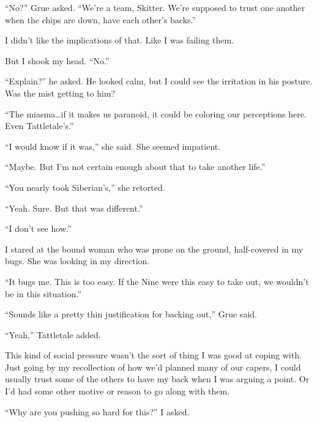 ``No?''  Grue asked.  ``We're a team, Skitter.  We're supposed to trust one another when the chips are down, have each other's backs.''



I didn't like the implications of that.  Like I was failing them.



But I shook my head.  ``No.''



``Explain?'' he asked.  He looked calm, but I could see the irritation in his posture.  Was the mist getting to him?



``The miasma\ldots if it makes us paranoid, it could be coloring our perceptions here.  Even Tattletale's.''



``I would know if it was,'' she said.  She seemed impatient.



``Maybe.  But I'm not certain enough about that to take another life.''



``You nearly took Siberian's,'' she retorted.



``Yeah.  Sure.  But that was different.''



``I don't see how.''



I stared at the bound woman who was prone on the ground, half-covered in my bugs.  She was looking in my direction.



``It bugs me.  This is too easy.  If the Nine were this easy to take out, we wouldn't be in this situation.''



``Sounds like a pretty thin justification for backing out,'' Grue said.



``Yeah,'' Tattletale added.



This kind of social pressure wasn't the sort of thing I was good at coping with.  Just going by my recollection of how we'd planned many of our capers, I could usually trust some of the others to have my back when I was arguing a point.  Or I'd had some other motive or reason to go along with them.



``Why are you pushing so hard for this?''  I asked.



